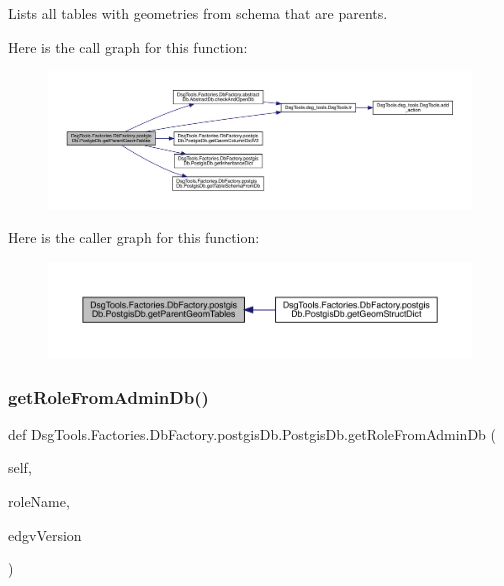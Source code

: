 \begin{DoxyVerb}Lists all tables with geometries from schema that are parents.
\end{DoxyVerb}
 Here is the call graph for this function\+:
\nopagebreak
\begin{figure}[H]
\begin{center}
\leavevmode
\includegraphics[width=350pt]{class_dsg_tools_1_1_factories_1_1_db_factory_1_1postgis_db_1_1_postgis_db_ada0c13dfb9ad99d13ac630e4b0830778_cgraph}
\end{center}
\end{figure}
Here is the caller graph for this function\+:
\nopagebreak
\begin{figure}[H]
\begin{center}
\leavevmode
\includegraphics[width=350pt]{class_dsg_tools_1_1_factories_1_1_db_factory_1_1postgis_db_1_1_postgis_db_ada0c13dfb9ad99d13ac630e4b0830778_icgraph}
\end{center}
\end{figure}
\mbox{\label{class_dsg_tools_1_1_factories_1_1_db_factory_1_1postgis_db_1_1_postgis_db_a8dd4d4bac8f4ccb35d3e1a4d089f29e4}} 
\subsubsection{\texorpdfstring{get\+Role\+From\+Admin\+Db()}{getRoleFromAdminDb()}}
{\footnotesize\ttfamily def Dsg\+Tools.\+Factories.\+Db\+Factory.\+postgis\+Db.\+Postgis\+Db.\+get\+Role\+From\+Admin\+Db (\begin{DoxyParamCaption}\item[{}]{self,  }\item[{}]{role\+Name,  }\item[{}]{edgv\+Version }\end{DoxyParamCaption})}

